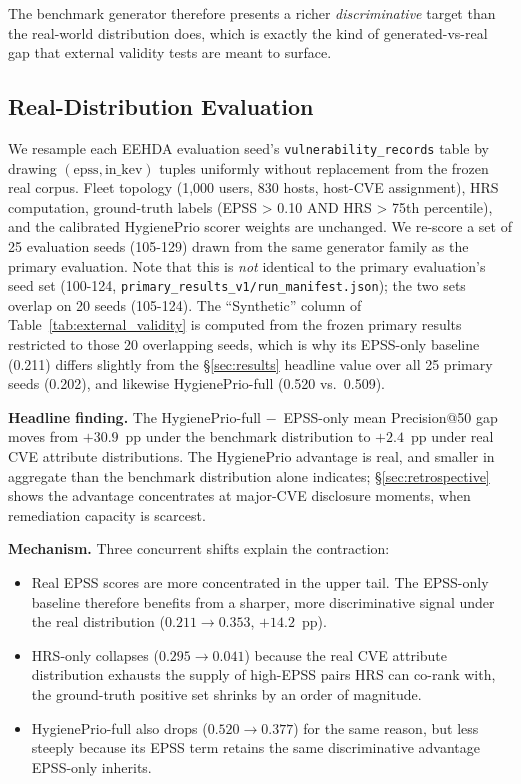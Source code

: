 The benchmark generator therefore presents a richer
\emph{discriminative} target than the real-world distribution does,
which is exactly the kind of generated-vs-real gap that external
validity tests are meant to surface.

\subsection{Real-Distribution Evaluation}

We resample each EEHDA evaluation seed's
\texttt{vulnerability\_records} table by drawing
$(\mathrm{epss}, \mathrm{in\_kev})$ tuples uniformly without
replacement from the frozen real corpus. Fleet topology (1{,}000 users,
830 hosts, host-CVE assignment), HRS computation, ground-truth
labels (EPSS > 0.10 AND HRS > 75th percentile), and the calibrated
HygienePrio scorer weights are unchanged. We re-score a set of 25
evaluation seeds (105-129) drawn from the same generator family as
the primary evaluation. Note that this is \emph{not} identical to the
primary evaluation's seed set (100-124,
\texttt{primary\_results\_v1/\allowbreak run\_manifest.json}); the two sets
overlap on 20 seeds (105-124). The ``Synthetic'' column of
Table~\ref{tab:external_validity} is computed from the frozen primary
results restricted to those 20 overlapping seeds, which is why its
EPSS-only baseline (0.211) differs slightly from the \S\ref{sec:results}
headline value over all 25 primary seeds (0.202), and likewise
HygienePrio-full (0.520 vs.\ 0.509).



\textbf{Headline finding.} The HygienePrio-full
$-$~EPSS-only mean Precision@50 gap moves from
$+30.9$~pp under the benchmark distribution to $+2.4$~pp under
real CVE attribute distributions. The HygienePrio advantage is
real, and smaller in aggregate than the benchmark distribution alone
indicates; \S\ref{sec:retrospective} shows the advantage concentrates at
major-CVE disclosure moments, when remediation capacity is scarcest.

\textbf{Mechanism.} Three concurrent shifts explain the contraction:
\begin{itemize}
\item Real EPSS scores are more concentrated in the upper tail.
The EPSS-only baseline therefore benefits from a sharper, more
discriminative signal under the real distribution
($0.211 \to 0.353$, $+14.2$~pp).
\item HRS-only collapses ($0.295 \to 0.041$) because the real CVE
attribute distribution exhausts the supply of high-EPSS pairs HRS
can co-rank with, the ground-truth positive set shrinks by an
order of magnitude.
\item HygienePrio-full also drops ($0.520 \to 0.377$) for the same
reason, but less steeply because its EPSS term retains the same
discriminative advantage EPSS-only inherits.
\end{itemize}

